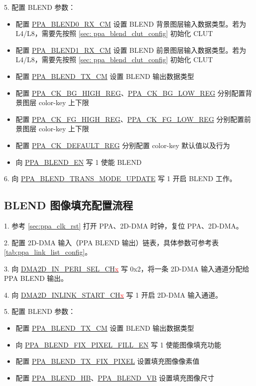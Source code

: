 \documentclass[main\_\_CN.tex]{subfiles}
\begin{document}
5. 配置 BLEND 参数：

\begin{itemize}
    \item 配置 \hyperref[fielddesc:PPABLEND0RXCM]{PPA\_BLEND0\_RX\_CM} 设置 BLEND 背景图层输入数据类型。若为 L4/L8，需要先按照 \ref{sec: ppa_blend_clut_config} 初始化 CLUT
    \item 配置 \hyperref[fielddesc:PPABLEND1RXCM]{PPA\_BLEND1\_RX\_CM} 设置 BLEND 前景图层输入数据类型。若为 L4/L8，需要先按照 \ref{sec: ppa_blend_clut_config} 初始化 CLUT
    \item 配置 \hyperref[fielddesc:PPABLENDTXCM]{PPA\_BLEND\_TX\_CM} 设置 BLEND 输出数据类型
    \item 配置 \hyperref[regdesc:PPACKBGHIGHREG]{PPA\_CK\_BG\_HIGH\_REG}、\hyperref[regdesc:PPACKBGLOWREG]{PPA\_CK\_BG\_LOW\_REG} 分别配置背景图层 color-key 上下限
    \item 配置 \hyperref[regdesc:PPACKFGHIGHREG]{PPA\_CK\_FG\_HIGH\_REG}、\hyperref[regdesc:PPACKFGLOWREG]{PPA\_CK\_FG\_LOW\_REG} 分别配置前景图层 color-key 上下限
    \item 配置 \hyperref[regdesc:PPACKDEFAULTREG]{PPA\_CK\_DEFAULT\_REG} 分别配置 color-key 默认值以及行为
    \item 向 \hyperref[fielddesc:PPABLENDEN]{PPA\_BLEND\_EN} 写 1 使能 BLEND
\end{itemize}

6. 向 \hyperref[fielddesc:PPABLENDTRANSMODEUPDATE]{PPA\_BLEND\_TRANS\_MODE\_UPDATE} 写 1 开启 BLEND 工作。

\subsection{BLEND 图像填充配置流程}
1. 参考 \ref{sec:ppa_clk_rst} 打开 PPA、2D-DMA 时钟，复位 PPA、2D-DMA。

2. 配置 2D-DMA 输入（PPA BLEND 输出）链表，具体参数可参考表 \ref{tab:ppa_link_list_config}。

3. 向 \hyperref[fielddesc:DMA2DINPERISELCHN]{DMA2D\_IN\_PERI\_SEL\_CH\textcolor{red}{x}} 写 0x2，将一条 2D-DMA 输入通道分配给 PPA BLEND 输出。

4. 向 \hyperref[fielddesc:DMA2DINLINKSTARTCHN]{DMA2D\_INLINK\_START\_CH\textcolor{red}{x}} 写 1 开启 2D-DMA 输入通道。

5. 配置 BLEND 参数：
\begin{itemize}
    \item 配置 \hyperref[fielddesc:PPABLENDTXCM]{PPA\_BLEND\_TX\_CM} 设置 BLEND 输出数据类型
    \item 向 \hyperref[fielddesc:PPABLENDFIXPIXELFILLEN]{PPA\_BLEND\_FIX\_PIXEL\_FILL\_EN} 写 1 使能图像填充功能
    \item 配置 \hyperref[fielddesc:PPABLENDTXFIXPIXEL]{PPA\_BLEND\_TX\_FIX\_PIXEL} 设置填充图像像素值
    \item 配置 \hyperref[fielddesc:PPABLENDHB]{PPA\_BLEND\_HB}、\hyperref[fielddesc:PPABLENDVB]{PPA\_BLEND\_VB} 设置填充图像尺寸
\end{itemize}
\end{document}
